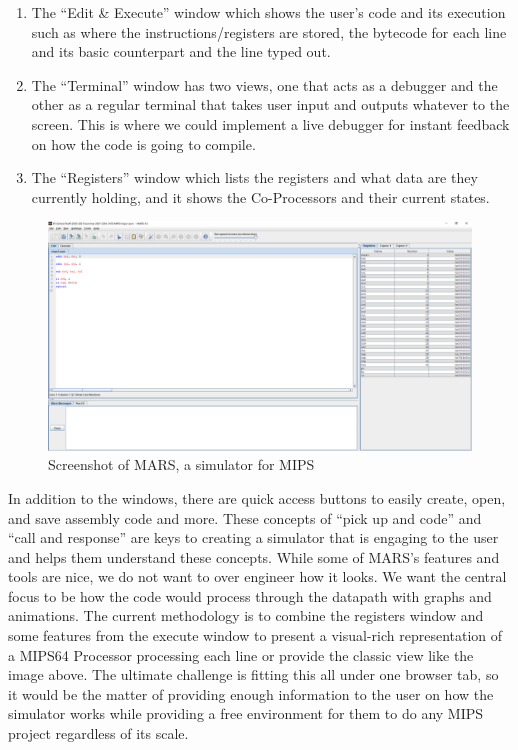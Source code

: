 \documentclass[parskip=half, fontsize=12pt]{scrartcl}
\providecommand{\tightlist}{%
  \setlength{\itemsep}{0pt}\setlength{\parskip}{0pt}}
\begin{document}
\begin{enumerate}
    \tightlist
    \item The ``Edit \& Execute'' window which shows the user's code and its
        execution such as where the instructions/registers are stored, the
        bytecode for each line and its basic counterpart and the line typed out.
    \item The ``Terminal'' window has two views, one that acts as a debugger
        and the other as a regular terminal that takes user input and outputs
        whatever to the screen. This is where we could implement a live debugger
        for instant feedback on how the code is going to compile.
    \item The ``Registers'' window which lists the registers and what data are
        they currently holding, and it shows the Co-Processors and their current
        states.
\end{enumerate}

\begin{figure}[H]
    \includegraphics[width=\textwidth]{mars}
    \caption{Screenshot of MARS, a simulator for MIPS}
    \label{fig:mars}
\end{figure}

In addition to the windows, there are quick access buttons to easily
create, open, and save assembly code and more. These concepts of ``pick
up and code'' and ``call and response'' are keys to creating a simulator
that is engaging to the user and helps them understand these concepts.
While some of MARS's features and tools are nice, we do not want to over
engineer how it looks. We want the central focus to be how the code
would process through the datapath with graphs and animations. The
current methodology is to combine the registers window and some features
from the execute window to present a visual-rich representation of a
MIPS64 Processor processing each line or provide the classic view like
the image above. The ultimate challenge is fitting this all under one
browser tab, so it would be the matter of providing enough information
to the user on how the simulator works while providing a free
environment for them to do any MIPS project regardless of its scale.
\end{document}
